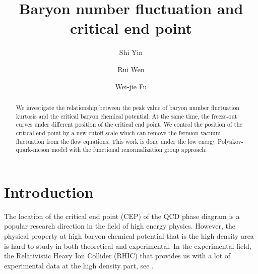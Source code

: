 \documentclass[%
reprint,
superscriptaddress,
showpacs,preprintnumbers,
 amsmath,amssymb,
 aps,
prl,
]{revtex4-1}
\begin{document}
\preprint{}

\title{Baryon number fluctuation and critical end point
}

\author{Shi Yin}

\author{Rui Wen}

\author{Wei-jie Fu}


\begin{abstract}

We investigate the relationship between the peak value of baryon number fluctuation kurtosis and the critical baryon chemical potential. At the same time, the freeze-out curves under different position of the critical end point. We control the position of the critical end point by a new cutoff scale which can remove the fermion vacuum fluctuation from the flow equations. This work is done under the low energy Polyakov-quark-meson model with the functional renormalization group approach.

\end{abstract}

\maketitle



\section{Introduction}
\label{sec:int}

The location of the critical end point (CEP) of the QCD phase diagram is a popular research direction in the field of high energy physics. However, the physical property at high baryon chemical potential that is the high density area is hard to study in both theoretical and experimental. In the experimental field, the Relativistic Heavy Ion Collider (RHIC) that provides us with a lot of experimental data at the high density part, see \cite{Adamczyk:2013dal,Luo:2015ewa,Luo:2017faz}.
\end{document}

